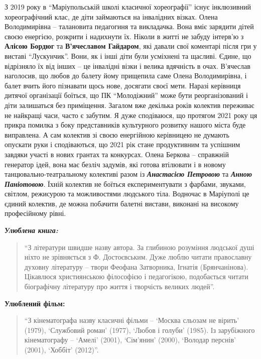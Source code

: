 З 2019 року в \enquote{Маріупольській школі класичної хореографії} існує інклюзивний
хореографічний клас, де діти займаються на інвалідних візках. Олена
Володимирівна – талановита педагогиня та викладачка. Вона вміє зарядити дітей
своєю енергією, розкрити і надихнути їх. Ніколи в житті не забуду інтерв'ю з
\textbf{Алісою Бордюг} та \textbf{В'ячеславом Гайдаром}, які давали свої коментарі після гри у
виставі \enquote{Лускунчик}. Вони, як і інші діти були усміхнені та щасливі. Єдине, що
відрізняло їх від інших – це інвалідні візки і велика вдячність в очах.
В'ячеслав наголосив, що любов до балету йому прищепила саме Олена
Володимирівна, і балет вчить його пізнавати щось нове, досягати своєї мети.
Наразі керівниця дитячої організації боїться, що ПК \enquote{Молодіжний} може бути
реорганізований і діти залишаться без приміщення. Загалом вже декілька років
колектив переживає не найкращі часи, часто є забутим. Я дуже сподіваюся, що
протягом 2021 року ця прикра помилка з боку представників культурного розвитку
нашого міста буде виправлена. А сам колектив зі своєю енергійною керівницею не
думають опускати руки і сподіваються, що 2021 рік стане продуктивним та
успішним завдяки участі в нових грантах та конкурсах. Олена Беркова – справжній
генератор ідей, вона має безліч задумів, які готова втілювати і в новому
танцювально-театральному колективі разом із \emph{\textbf{Анастасією Петровою}} та \emph{\textbf{Анною
Паніотовою}}. Їхній колектив не боїться експериментувати з фарбами, звуками,
світлом, режисурою та можливостями людського тіла. Водночас в Маріуполі це
єдиний колектив, де можна побачити балетні вистави, виконані на високому
професійному рівні.


\begingroup
\em
\textbf{Улюблена книга:}

\begin{quote}
\enquote{З літератури швидше назву автора. За глибиною розуміння людської душі ніхто не
зрівняється з Ф. Достоєвським. Дуже люблю читати православну духовну
літературу – твори Феофана Затворника, Ігнатія (Брянчанінова).
Цікавлюся християнською філософією і педагогікою, подобається читати
біографічну літературу про життя і творчість великих людей}.
\end{quote}

\textbf{Улюблений фільм:} 

\begin{quote}
\enquote{З кінематографа назву класичні фільми – \enquote{Москва сльозам не вірить} (1979),
\enquote{Службовий роман} (1977), \enquote{Любов і голуби} (1985). Із зарубіжного кінематографу
– \enquote{Амелі} (2001), \enquote{Сім'янин} (2000), \enquote{Володар перснів} (2001), \enquote{Хоббіт}
(2012)}.
\end{quote}

